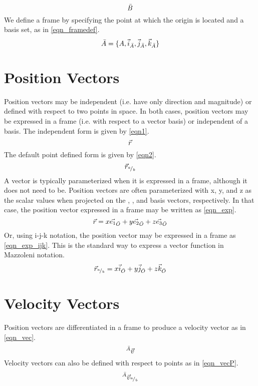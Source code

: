 \documentclass{article}
\begin{document}
	\begin{equation}
	\label{eqn_frame}
	\refFrame{B}
	\end{equation}
	We define a frame by specifying the point at which the origin is located and a basis set, as in \ref{eqn_framedef}.
	\begin{equation}
	\label{eqn_framedef}
	\refFrame{A} = \refFrameDefIJK{A}{A}
	\end{equation}
	
	\section{Position Vectors}
	Position vectors may be independent (i.e. have only direction and magnitude) or defined with respect to two points in space. In both cases, position vectors may be expressed in a frame (i.e. with respect to a vector basis) or independent of a basis. The independent form is given by \ref{eqn1}.
	\begin{equation}
		\label{eqn1}
		\gVec{r}
	\end{equation}
	The default point defined form is given by \ref{eqn2}.
	\begin{equation}
		\label{eqn2}
		\posVecP{r}{a}{b}
	\end{equation}
	A vector is typically parameterized when it is expressed in a frame, although it does not need to be. Position vectors are often parameterized with x, y, and z as the scalar values when projected on the , , and  basis vectors, respectively. In that case, the position vector expressed in a frame may be written as \ref{eqn_exp}.
	\begin{equation}
		\label{eqn_exp}
		\gVec{r} = \gVecExp{O}{x}{y}{z}
	\end{equation} 
	Or, using i-j-k notation, the position vector may be expressed in a frame as \ref{eqn_exp_ijk}. This is the standard way to express a vector function in Mazzoleni notation.
	\begin{equation}
	\label{eqn_exp_ijk}
	\posVecP{r}{a}{b} = \gVecExpIJK{O}{x}{y}{z}
	\end{equation}
	
	
	\section{Velocity Vectors}
	Position vectors are differentiated in a frame to produce a velocity vector as in \ref{eqn_vec}. 
	\begin{equation}
	\label{eqn_vec}
	\velVec{A}{v}
	\end{equation}
	Velocity vectors can also be defined with respect to points as in \ref{eqn_vecP}.
	\begin{equation}
	\label{eqn_vecP}
	\velVecP{A}{v}{a}{b}
	\end{equation}
	
\end{document}
